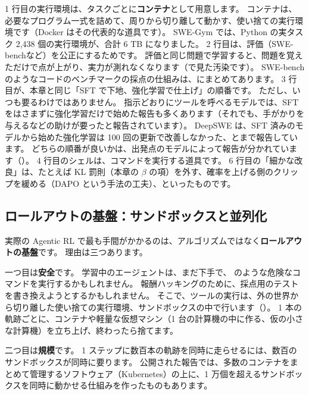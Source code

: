 1 行目の実行環境は、タスクごとに\textbf{コンテナ}として用意します。
コンテナは、必要なプログラム一式を詰めて、周りから切り離して動かす、使い捨ての実行環境です（Docker はその代表的な道具です）。
SWE-Gym では、Python の実タスク 2,438 個の実行環境が、合計 6 TB になりました\cite{pan2025swegym}。
2 行目は、評価（SWE-bench\cite{jimenez2024swebench}など）を公正にするためです。
評価と同じ問題で学習すると、問題を覚えただけで点が上がり、実力が測れなくなります（で見た汚染です）。
SWE-bench のようなコードのベンチマークの採点の仕組みは、にまとめてあります。
3 行目が、本章と同じ「SFT で下地、強化学習で仕上げ」の順番です。
ただし、いつも要るわけではありません。
指示どおりにツールを呼べるモデルでは、SFT をはさまずに強化学習だけで始めた報告も多くあります\cite{agentica2025deepswe,liu2026arcticswe}（それでも、手がかりを与えるなどの助けが要ったと報告されています\cite{cao2025skyrl}）。
DeepSWE は、SFT 済みのモデルから始めた強化学習は 100 回の更新で改善しなかった、とまで報告しています\cite{agentica2025deepswe}。
どちらの順番が良いかは、出発点のモデルによって報告が分かれています（）。
4 行目のシェルは、コマンドを実行する道具です。
6 行目の「細かな改良」は、たとえば KL 罰則（本章の $\beta$ の項）を外す、確率を上げる側のクリップを緩める（DAPO という手法\cite{yu2025dapo}の工夫）、といったものです\cite{agentica2025deepswe}。

\subsection{ロールアウトの基盤：サンドボックスと並列化}

実際の Agentic RL で最も手間がかかるのは、アルゴリズムではなく\textbf{ロールアウトの基盤}です。
理由は三つあります。

一つ目は\textbf{安全}です。
学習中のエージェントは、まだ下手で、 のような危険なコマンドを実行するかもしれません。
報酬ハッキングのために、採点用のテストを書き換えようとするかもしれません。
そこで、ツールの実行は、外の世界から切り離した使い捨ての実行環境、サンドボックスの中で行います（）。
1 本の軌跡ごとに、コンテナや軽量な仮想マシン（1 台の計算機の中に作る、仮の小さな計算機）を立ち上げ、終わったら捨てます。

二つ目は\textbf{規模}です。
1 ステップに数百本の軌跡を同時に走らせるには、数百のサンドボックスが同時に要ります。
公開された報告では、多数のコンテナをまとめて管理するソフトウェア（Kubernetes）の上に、1 万個を超えるサンドボックスを同時に動かせる仕組みを作ったものもあります\cite{bai2025kimik2}。

